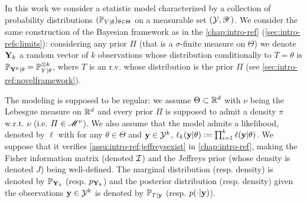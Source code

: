 



In this work we consider a statistic model characterized by a collection of probability distributions $(\mathbb{P}_{Y|\theta})_{\theta\in\Theta}$ on  a measurable set $(\mathcal{Y},\mathscr{Y})$. 
We consider the same construction of the Bayesian framework as in the \cref{chap:intro-ref} (\cref{sec:intro-refs:limits}): considering any prior $\varPi$ (that is a $\sigma$-finite measure on $\Theta$) we denote $\mathbf{Y}_k$ a random vector of $k$ observations whose distribution conditionally to $T=\theta$ is $\mathbb{P}_{\mathbf{Y}^k|\theta}=\mathbb{P}_{Y|\theta}^{\otimes k}$, where $T$ is an r.v. whose distribution is the prior $\varPi$ (see \cref{sec:intro-ref:novelframework}).

The modeling is supposed to be regular: we assume $\Theta\subset\mathbb{R}^d$ with $\nu$ being the Lebesgue measure on $\mathbb{R}^d$ and every prior $\varPi$ is supposed to admit a density $\pi$ w.r.t. $\nu$ (i.e. $\varPi\in\mathscr{M}^\nu$).
We also assume that the model admits a likelihood, denoted by $\ell$ with for any $\theta\in\Theta$ and $\mathbf{y}\in\mathcal{Y}^k$, $\ell_k(\mathbf{y}|\theta):= \prod_{i=1}^k\ell(\mathbf{y}|\theta)$. We suppose that it verifies \cref{assu:intro-ref:jeffreysexist} in \cref{chap:intro-ref}, making the Fisher information matrix (denoted $\mathcal{I}$) and the Jeffreys prior (whose density is denoted $J$) being well-defined.
The marginal distribution (resp. density)  is denoted by $\mathbb{P}_{\mathbf{Y}_k}$ (resp. $p_{\mathbf{Y}_k}$) and the posterior distribution (resp. density) given the observations $\mathbf{y}\in\mathcal{Y}^k$ is denoted by $\mathbb{P}_{T|\mathbf{y}}$ (resp. $p(\cdot|\mathbf{y})$).



